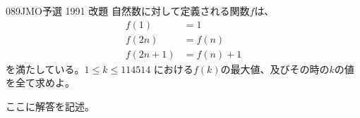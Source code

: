 \begin{prob}{089}{}{JMO予選 1991 改題}
 自然数に対して定義される関数$f$は、
 \begin{align*}
  f(1)&=1 \\
  f(2n)&=f(n) \\
  f(2n+1)&=f(n)+1
 \end{align*}
 を満たしている。$1\le k \le 114514$ における$f(k)$の最大値、及びその時の$k$の値を全て求めよ。
\end{prob}
ここに解答を記述。